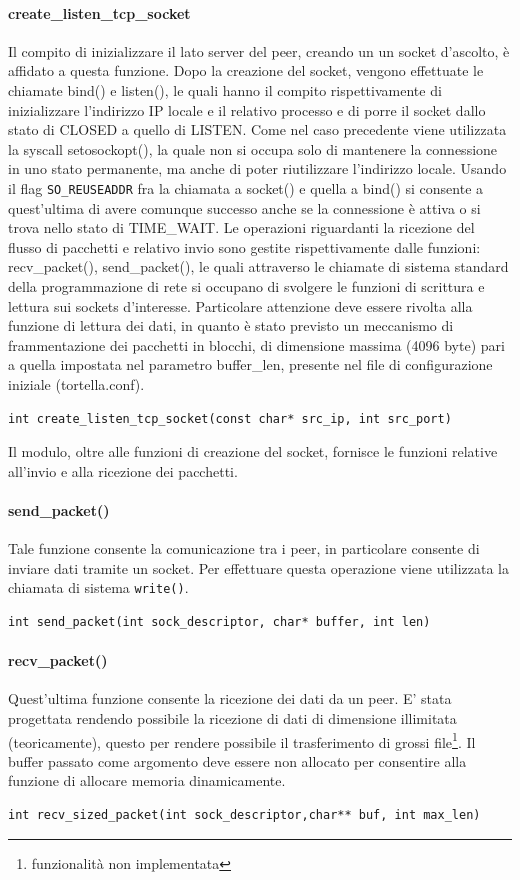 \paragraph{create\_listen\_tcp\_socket} 
Il compito di inizializzare il lato server del peer, creando un un socket d'ascolto, è affidato a questa funzione. Dopo la creazione del socket, vengono effettuate le chiamate bind() e listen(), le quali hanno il compito rispettivamente di inizializzare l'indirizzo IP locale e il relativo processo e di porre il socket dallo stato di CLOSED a quello di LISTEN. Come nel caso precedente viene utilizzata la syscall setosockopt(), la quale non si occupa solo di mantenere la connessione in uno stato permanente, ma anche di poter riutilizzare l'indirizzo locale. Usando il flag \texttt{SO\_REUSEADDR} fra la chiamata a socket() e quella a bind() si consente a quest'ultima di avere comunque successo anche se la connessione è attiva o si trova nello stato di TIME\_WAIT.  
Le operazioni riguardanti la ricezione del flusso di pacchetti e relativo invio sono gestite rispettivamente dalle funzioni: recv\_packet(), send\_packet(), le quali attraverso le chiamate di sistema standard della programmazione di rete si occupano di svolgere le funzioni di scrittura e lettura sui sockets d'interesse. Particolare attenzione deve essere rivolta alla funzione di lettura dei dati, in quanto è stato previsto un meccanismo di frammentazione dei pacchetti in blocchi, di dimensione massima (4096 byte) pari a quella impostata nel parametro buffer\_len, presente nel file di configurazione iniziale (tortella.conf).
\begin{lstlisting}
int create_listen_tcp_socket(const char* src_ip, int src_port)
\end{lstlisting}
Il modulo, oltre alle funzioni di creazione del socket, fornisce le funzioni relative all'invio e alla ricezione dei pacchetti.
\paragraph{send\_packet()}
Tale funzione consente la comunicazione tra i peer, in particolare consente di inviare dati tramite un socket. Per effettuare questa operazione viene utilizzata la chiamata di sistema \texttt{write()}.
\begin{lstlisting}
int send_packet(int sock_descriptor, char* buffer, int len)
\end{lstlisting}
\paragraph{recv\_packet()}
Quest'ultima funzione consente la ricezione dei dati da un peer. E' stata progettata rendendo possibile la ricezione di dati di dimensione illimitata (teoricamente), questo per rendere possibile il trasferimento di grossi file\footnote{funzionalità non implementata}. Il buffer passato come argomento deve essere non allocato per consentire alla funzione di allocare memoria dinamicamente.
\begin{lstlisting}
int recv_sized_packet(int sock_descriptor,char** buf, int max_len)
\end{lstlisting}
